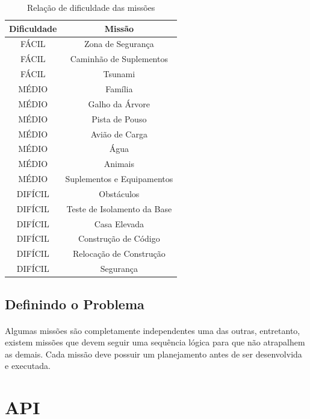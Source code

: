 \documentclass{article}
\begin{document}
		\begin{table}[h!]
			\begin{center}
				\begin{tabular}{cc}
					\toprule
						Dificuldade & Missão\\
					\midrule
						FÁCIL & Zona de Segurança\\
					    FÁCIL & Caminhão de Suplementos\\
					    FÁCIL & Tsunami\\
					    MÉDIO & Família\\
					    MÉDIO & Galho da Árvore\\
					    MÉDIO & Pista de Pouso\\
					    MÉDIO & Avião de Carga\\
					    MÉDIO & Água\\
					    MÉDIO & Animais\\
					    MÉDIO & Suplementos e Equipamentos\\
						DIFÍCIL & Obstáculos\\
					    DIFÍCIL & Teste de Isolamento da Base\\
					    DIFÍCIL & Casa Elevada\\
					    DIFÍCIL & Construção de Código\\
					    DIFÍCIL & Relocação de Construção\\
					    DIFÍCIL & Segurança\\
				    \bottomrule
				\end{tabular}
				\caption{Relação de dificuldade das missões}
				\label{tab:table_dificulty}
			\end{center}
		\end{table}

	\subsection{Definindo o Problema}
		\paragraph{}
			Algumas missões são completamente independentes uma das outras, 
			entretanto, existem missões que devem seguir uma sequência lógica 
			para que não atrapalhem as demais. Cada missão deve possuir um 
			planejamento antes de ser desenvolvida e executada.

\newpage
\section{API}
\end{document}
